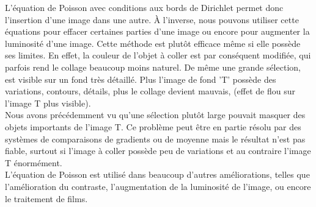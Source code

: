 L'équation de Poisson avec conditions aux bords de Dirichlet permet donc l'insertion d'une image dans une autre. À l'inverse, nous pouvons utiliser cette équations pour effacer certaines parties d'une image ou encore pour augmenter la luminosité d'une image. Cette méthode est plutôt efficace même si elle possède ses limites. En effet, la couleur de l'objet à coller est par conséquent modifiée, qui parfois rend le collage beaucoup moins naturel. De même une grande sélection, est visible sur un fond très détaillé. Plus l'image de fond 'T' possède des variations, contours, détails, plus le collage devient mauvais, (effet de flou sur l'image T plus visible). \\
Nous avons précédemment vu qu'une sélection plutôt large pouvait masquer des objets importants de l'image T. Ce problème peut être en partie résolu par des systèmes de comparaisons de gradients ou de moyenne mais le résultat n'est pas fiable, surtout si l'image à coller possède peu de variations et au contraire l'image T énormément.\\ 
L'équation de Poisson est utilisé dans beaucoup d'autres améliorations, telles que l'amélioration du contraste, l'augmentation de la luminosité de l'image, ou encore le traitement de films.